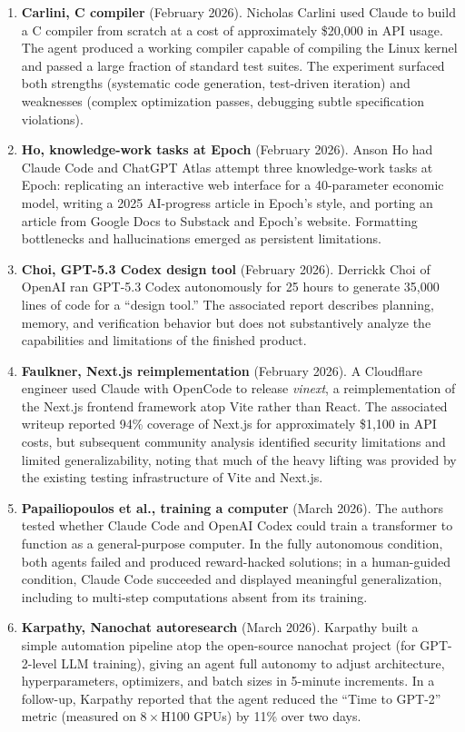 \documentclass{article}
\begin{document}
\begin{enumerate}[leftmargin=16pt]
\item \textbf{Carlini, C compiler} \citep{anthropicComEngineeringBuilding} (February 2026). Nicholas Carlini used Claude to build a C compiler from scratch at a cost of approximately \$20{,}000 in API usage. The agent produced a working compiler capable of compiling the Linux kernel and passed a large fraction of standard test suites. The experiment surfaced both strengths (systematic code generation, test-driven iteration) and weaknesses (complex optimization passes, debugging subtle specification violations).
\item \textbf{Ho, knowledge-work tasks at Epoch} \citep{epochAiGradientUpdates} (February 2026). Anson Ho had Claude Code and ChatGPT Atlas attempt three knowledge-work tasks at Epoch: replicating an interactive web interface for a 40-parameter economic model, writing a 2025 AI-progress article in Epoch's style, and porting an article from Google Docs to Substack and Epoch's website. Formatting bottlenecks and hallucinations emerged as persistent limitations.
\item \textbf{Choi, GPT-5.3 Codex design tool} \citep{developersOpenaiComBlog} (February 2026). Derrickk Choi of OpenAI ran GPT-5.3 Codex autonomously for 25 hours to generate 35{,}000 lines of code for a ``design tool.'' The associated report describes planning, memory, and verification behavior but does not substantively analyze the capabilities and limitations of the finished product.
\item \textbf{Faulkner, Next.js reimplementation} \citep{blogCloudflareComVinext} (February 2026). A Cloudflare engineer used Claude with OpenCode to release \emph{vinext}, a reimplementation of the Next.js frontend framework atop Vite rather than React. The associated writeup reported 94\% coverage of Next.js for approximately \$1{,}100 in API costs, but subsequent community analysis \citep{newsYcombinatorComItem} identified security limitations and limited generalizability, noting that much of the heavy lifting was provided by the existing testing infrastructure of Vite and Next.js.
\item \textbf{Papailiopoulos et al., training a computer} \citep{xDimitrisPapail2028669695344148946} (March 2026). The authors tested whether Claude Code and OpenAI Codex could train a transformer to function as a general-purpose computer. In the fully autonomous condition, both agents failed and produced reward-hacked solutions; in a human-guided condition, Claude Code succeeded and displayed meaningful generalization, including to multi-step computations absent from its training.
\item \textbf{Karpathy, Nanochat autoresearch} \citep{xkarpathy2031135152349524125} (March 2026). Karpathy built a simple automation pipeline atop the open-source nanochat project (for GPT-2-level LLM training), giving an agent full autonomy to adjust architecture, hyperparameters, optimizers, and batch sizes in 5-minute increments. In a follow-up, Karpathy reported that the agent reduced the ``Time to GPT-2'' metric (measured on $8\times$H100 GPUs) by 11\% over two days.
\end{enumerate}
\end{document}
